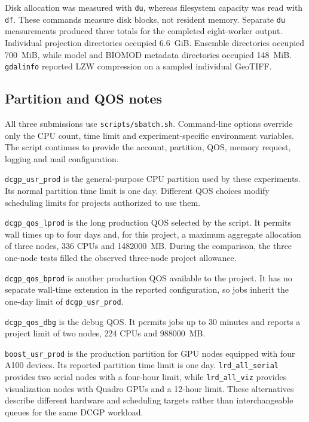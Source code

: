 Disk allocation was measured with \texttt{du}, whereas filesystem capacity was read with \texttt{df}. These commands measure disk blocks, not resident memory. Separate \texttt{du} measurements produced three totals for the completed eight-worker output. Individual projection directories occupied 6.6~GiB. Ensemble directories occupied 700~MiB, while model and BIOMOD metadata directories occupied 148~MiB. \texttt{gdalinfo} reported LZW compression on a sampled individual GeoTIFF.

\subsection{Partition and QOS notes}

All three submissions use \texttt{scripts/sbatch.sh}. Command-line options override only the CPU count, time limit and experiment-specific environment variables. The script continues to provide the account, partition, QOS, memory request, logging and mail configuration.

\texttt{dcgp\_usr\_prod} is the general-purpose CPU partition used by these experiments. Its normal partition time limit is one day. Different QOS choices modify scheduling limits for projects authorized to use them.

\texttt{dcgp\_qos\_lprod} is the long production QOS selected by the script. It permits wall times up to four days and, for this project, a maximum aggregate allocation of three nodes, 336 CPUs and 1482000~MB. During the comparison, the three one-node tests filled the observed three-node project allowance.

\texttt{dcgp\_qos\_bprod} is another production QOS available to the project. It has no separate wall-time extension in the reported configuration, so jobs inherit the one-day limit of \texttt{dcgp\_usr\_prod}.

\texttt{dcgp\_qos\_dbg} is the debug QOS. It permits jobs up to 30 minutes and reports a project limit of two nodes, 224 CPUs and 988000~MB.

\texttt{boost\_usr\_prod} is the production partition for GPU nodes equipped with four A100 devices. Its reported partition time limit is one day. \texttt{lrd\_all\_serial} provides two serial nodes with a four-hour limit, while \texttt{lrd\_all\_viz} provides visualization nodes with Quadro GPUs and a 12-hour limit. These alternatives describe different hardware and scheduling targets rather than interchangeable queues for the same DCGP workload.

